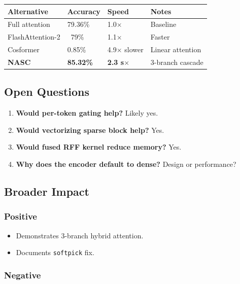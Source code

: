 \begin{table}[H]
\centering
\small
\begin{tabular}{llll}
\toprule
\textbf{Alternative} & \textbf{Accuracy} & \textbf{Speed} & \textbf{Notes} \\
\midrule
Full attention & 79.36\% & 1.0$\times$ & Baseline \\
FlashAttention-2 & ~79\% & 1.1$\times$ & Faster \\
Cosformer & 0.85\% & 4.9$\times$ slower & Linear attention \\
\textbf{NASC} & \textbf{85.32\%} & \textbf{2.3 s$\times$} & 3-branch cascade \\
\bottomrule
\end{tabular}
\end{table}

\subsection{Open Questions}

\begin{enumerate}
\item \textbf{Would per-token gating help?} Likely yes.
\item \textbf{Would vectorizing sparse block help?} Yes.
\item \textbf{Would fused RFF kernel reduce memory?} Yes.
\item \textbf{Why does the encoder default to dense?} Design or performance?

\end{enumerate}
\subsection{Broader Impact}

\subsubsection{Positive}

\begin{itemize}
\item Demonstrates 3-branch hybrid attention.
\item Documents \texttt{softpick} fix.

\end{itemize}
\subsubsection{Negative}

